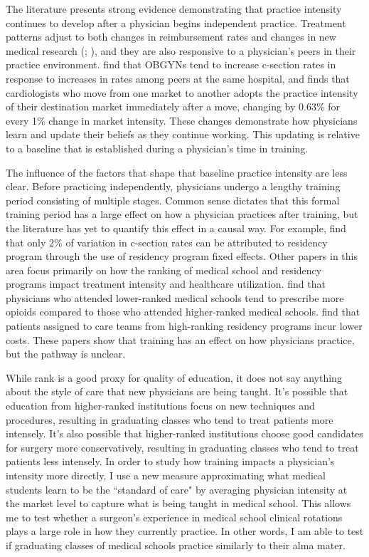 The literature presents strong evidence demonstrating that practice intensity continues to develop after a physician begins independent practice. Treatment patterns adjust to both changes in reimbursement rates and changes in new medical research (\cite{clemens2014}; \cite{decicca_how_2024}), and they are also responsive to a physician's peers in their practice environment. \textcite{epstein2009} find that OBGYNs tend to increase c-section rates in response to increases in rates among peers at the same hospital, and \textcite{molitor2018} finds that cardiologists who move from one market to another adopts the practice intensity of their destination market immediately after a move, changing by 0.63\% for every 1\% change in market intensity. These changes demonstrate how physicians learn and update their beliefs as they continue working. This updating is relative to a baseline that is established during a physician's time in training.

The influence of the factors that shape that baseline practice intensity are less clear. Before practicing independently, physicians undergo a lengthy training period consisting of multiple stages. Common sense dictates that this formal training period has a large effect on how a physician practices after training, but the literature has yet to quantify this effect in a causal way. For example, \textcite{epstein2009} find that only 2\% of variation in c-section rates can be attributed to residency program through the use of residency program fixed effects. Other papers in this area focus primarily on how the ranking of medical school and residency programs impact treatment intensity and healthcare utilization. \textcite{schnell_addressing_2018} find that physicians who attended lower-ranked medical schools tend to prescribe more opioids compared to those who attended higher-ranked medical schools. \textcite{doyle_jr_returns_2010} find that patients assigned to care teams from high-ranking residency programs incur lower costs. These papers show that training has an effect on how physicians practice, but the pathway is unclear. 

While rank is a good proxy for quality of education, it does not say anything about the style of care that new physicians are being taught. It's possible that education from higher-ranked institutions focus on new techniques and procedures, resulting in graduating classes who tend to treat patients more intensely. It's also possible that higher-ranked institutions choose good candidates for surgery more conservatively, resulting in graduating classes who tend to treat patients less intensely. In order to study how training impacts a physician's intensity more directly, I use a new measure approximating what medical students learn to be the ``standard of care" by averaging physician intensity at the market level to capture what is being taught in medical school. This allows me to test whether a surgeon's experience in medical school clinical rotations plays a large role in how they currently practice. In other words, I am able to test if graduating classes of medical schools practice similarly to their alma mater. 

